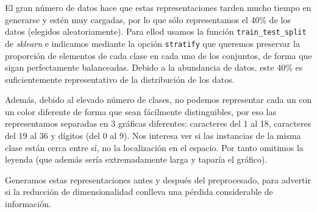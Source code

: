 \documentclass[a4]{article}
\begin{document}
El gran número de datos hace que estas representaciones tarden mucho
tiempo en generarse y estén muy cargadas, por lo que sólo
representamos el 40\% de los datos (elegidos aleatoriamente). Para ellod usamos la función \texttt{train\_test\_split} de \textit{sklearn} e indicamos mediante la opción \texttt{stratify} que queremos
preservar la proporción de elementos de cada clase en cada uno de los
conjuntos, de forma que sigan perfectamente balanceadas. Debido a la abundancia de datos, este 40\% es suficientemente representativo de la distribución de los datos.

Además, debido al elevado número de clases, no podemos representar
cada un con un color diferente de forma que sean fácilmente
distinguibles, por eso las representamos separadas en 3 gráficas
diferentes: caracteres del 1 al 18, caracteres del 19 al 36 y dígitos
(del 0 al 9). Nos interesa ver si las instancias de la misma clase
están cerca entre sí, no la localización en el espacio. Por tanto
omitimos la leyenda (que además sería extremadamente larga y taparía
el gráfico).

Generamos estas representaciones antes y después del preprocesado,
para advertir si la reducción de dimensionalidad conlleva una pérdida
considerable de información.
\end{document}
